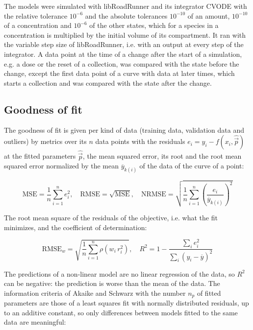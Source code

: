 The models were simulated with libRoadRunner \cite{Welsh2023} and its integrator CVODE \cite{Hindmarsh2005} with the relative tolerance $10^{-6}$ and the absolute tolerances $10^{-10}$ of an amount, $10^{-10}$ of a concentration and $10^{-6}$ of the other states, which for a species in a concentration is multiplied by the initial volume of its compartment. It ran with the variable step size of libRoadRunner, i.e. with an output at every step of the integrator. A data point at the time of a change after the start of a simulation, e.g. a dose or the reset of a collection, was compared with the state before the change, except the first data point of a curve with data at later times, which starts a collection and was compared with the state after the change.

\subsection{Goodness of fit}

The goodness of fit is given per kind of data (training data, validation data and outliers) by metrics over its $n$ data points with the residuals $e_i = y_i - f(x_i, \hat{\vec{p}})$ at the fitted parameters $\hat{\vec{p}}$, the mean squared error, its root and the root mean squared error normalized by the mean $\overline{y}_{k(i)}$ of the data of the curve of a point:

\begin{equation}
\mathrm{MSE} = \frac{1}{n} \sum_{i=1}^{n} e_i^2, \quad \mathrm{RMSE} = \sqrt{\mathrm{MSE}}, \quad \mathrm{NRMSE} = \sqrt{\frac{1}{n} \sum_{i=1}^{n} \left(\frac{e_i}{\overline{y}_{k(i)}}\right)^2}
\end{equation}

The root mean square of the residuals of the objective, i.e. what the fit minimizes, and the coefficient of determination:

\begin{equation}
\mathrm{RMSE}_w = \sqrt{\frac{1}{n} \sum_{i=1}^{n} \rho\left(w_i\, r_i^2\right)}, \quad R^2 = 1 - \frac{\sum_{i} e_i^2}{\sum_{i} \left(y_i - \overline{y}\right)^2}
\end{equation}

The predictions of a non-linear model are no linear regression of the data, so $R^2$ can be negative: the prediction is worse than the mean of the data. The information criteria of Akaike \cite{Akaike1974} and Schwarz \cite{Schwarz1978} with the number $n_p$ of fitted parameters are those of a least squares fit with normally distributed residuals, up to an additive constant, so only differences between models fitted to the same data are meaningful:

